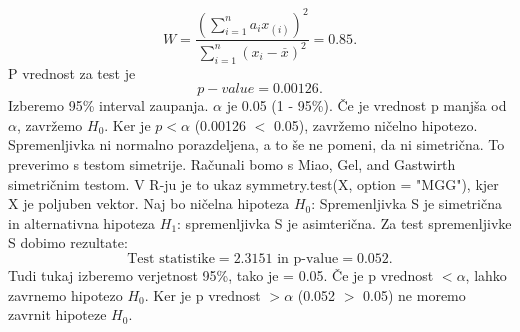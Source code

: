 \documentclass[a4paper,11pt]{article}
\begin{document}
\[W = \frac{(\sum_{i = 1}^{n}a_i x_{(i)})^2}{\sum_{i = 1}^{n}(x_i - \overset{\_}{x})^2} = 0.85.\]
 P vrednost za test je 
\[ p-value = 0.00126. \]
Izberemo 95\% interval zaupanja. \(\alpha\) je 0.05 (1 - 95\%). Če je vrednost p manjša od \(\alpha\), zavržemo \(H_0\). Ker je \(p < \alpha\) (0.00126 \(<\) 0.05), zavržemo ničelno hipotezo. Spremenljivka ni normalno porazdeljena, a to še ne pomeni, da ni simetrična. To preverimo s testom simetrije. Računali bomo s Miao, Gel, and Gastwirth simetričnim testom. V R-ju je to ukaz symmetry.test(X, option = "MGG")\cite{lawstat}, kjer X je poljuben vektor. Naj bo ničelna hipoteza \(H_0\): Spremenljivka S je simetrična in alternativna hipoteza \(H_1\): spremenljivka S je asimterična. Za test spremenljivke S dobimo rezultate:
\[\text{Test statistike} = 2.3151 \text{ in p-value} = 0.052.\]
Tudi tukaj izberemo verjetnost 95\%, tako je \alpha = 0.05. Če je p vrednost \(< \alpha\), lahko zavrnemo hipotezo \(H_0\). Ker je p vrednost \(> \alpha\) (0.052 \(>\) 0.05) ne moremo zavrnit hipoteze \(H_0\).
\end{document}
